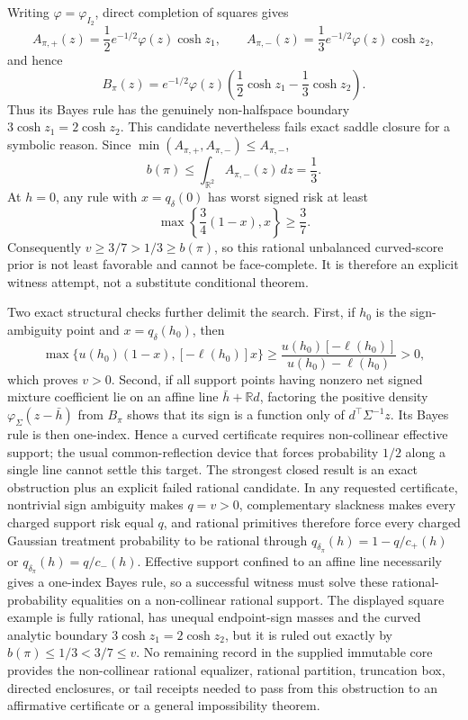 Writing \(\varphi=\varphi_{I_2}\), direct completion of squares gives
\[
 A_{\pi,+}(z)=\frac12 e^{-1/2}\varphi(z)\cosh z_1,
 \qquad
 A_{\pi,-}(z)=\frac13 e^{-1/2}\varphi(z)\cosh z_2,
\]
and hence
\[
 B_\pi(z)=e^{-1/2}\varphi(z)
 \left(\frac12\cosh z_1-\frac13\cosh z_2\right).
\]
Thus its Bayes rule has the genuinely non-halfspace boundary
\(3\cosh z_1=2\cosh z_2\).  This candidate nevertheless fails exact saddle closure for a symbolic reason.  Since \(\min(A_{\pi,+},A_{\pi,-})\leq A_{\pi,-}\),
\[
 b(\pi)\leq\int_{\mathbb R^2}A_{\pi,-}(z)\,dz=\frac13.
\]
At \(h=0\), any rule with \(x=q_\delta(0)\) has worst signed risk at least
\[
 \max\left\{\frac34(1-x),x\right\}\geq\frac37.
\]
Consequently \(v\geq3/7>1/3\geq b(\pi)\), so this rational unbalanced curved-score prior is not least favorable and cannot be face-complete.  It is therefore an explicit witness attempt, not a substitute conditional theorem.

Two exact structural checks further delimit the search.  First, if \(h_0\) is the sign-ambiguity point and \(x=q_\delta(h_0)\), then
\[
 \max\{u(h_0)(1-x),[-\ell(h_0)]x\}
 \geq\frac{u(h_0)[-\ell(h_0)]}{u(h_0)-\ell(h_0)}>0,
\]
which proves \(v>0\).  Second, if all support points having nonzero net signed mixture coefficient lie on an affine line \(\bar h+\mathbb R d\), factoring the positive density \(\varphi_\Sigma(z-\bar h)\) from \(B_\pi\) shows that its sign is a function only of \(d^\top\Sigma^{-1}z\).  Its Bayes rule is then one-index.  Hence a curved certificate requires non-collinear effective support; the usual common-reflection device that forces probability \(1/2\) along a single line cannot settle this target.
The strongest closed result is an exact obstruction plus an explicit failed rational candidate.  In any requested certificate, nontrivial sign ambiguity makes \(q=v>0\), complementary slackness makes every charged support risk equal \(q\), and rational primitives therefore force every charged Gaussian treatment probability to be rational through
\(q_{\delta_\pi}(h)=1-q/c_+(h)\) or \(q_{\delta_\pi}(h)=q/c_-(h)\).  Effective support confined to an affine line necessarily gives a one-index Bayes rule, so a successful witness must solve these rational-probability equalities on a non-collinear rational support.  The displayed square example is fully rational, has unequal endpoint-sign masses and the curved analytic boundary \(3\cosh z_1=2\cosh z_2\), but it is ruled out exactly by \(b(\pi)\leq1/3<3/7\leq v\).  No remaining record in the supplied immutable core provides the non-collinear rational equalizer, rational partition, truncation box, directed enclosures, or tail receipts needed to pass from this obstruction to an affirmative certificate or a general impossibility theorem.
